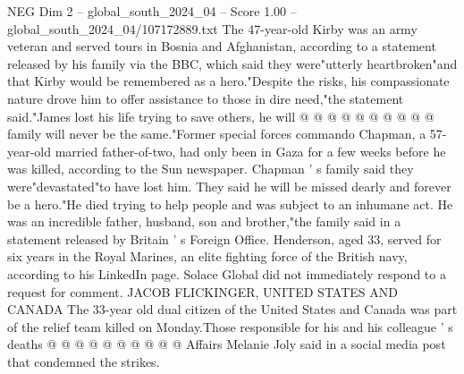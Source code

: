 \begin{textsample}{NEG Dim 2 – global\_south\_2024\_04 – Score 1.00 – global\_south\_2024\_04/107172889.txt}
The 47-year-old Kirby was an army veteran and served tours in Bosnia and Afghanistan, according to a statement released by his family via the BBC, which said they were"utterly heartbroken"and that Kirby would be remembered as a hero."Despite the risks, his compassionate nature drove him to offer assistance to those in dire need,"the statement said."James lost his life trying to save others, he will @ @ @ @ @ @ @ @ @ @ family will never be the same."Former special forces commando Chapman, a 57-year-old married father-of-two, had only been in Gaza for a few weeks before he was killed, according to the Sun newspaper.
Chapman ' s family said they were"devastated"to have lost him.
They said he will be missed dearly and forever be a hero."He died trying to help people and was subject to an inhumane act.
He was an incredible father, husband, son and brother,"the family said in a statement released by Britain ' s Foreign Office.
Henderson, aged 33, served for six years in the Royal Marines, an elite fighting force of the British navy, according to his LinkedIn page.
Solace Global did not immediately respond to a request for comment.
JACOB FLICKINGER, UNITED STATES AND CANADA The 33-year old dual citizen of the United States and Canada was part of the relief team killed on Monday.Those responsible for his and his colleague ' s deaths @ @ @ @ @ @ @ @ @ @ Affairs Melanie Joly said in a social media post that condemned the strikes.

\end{textsample}
